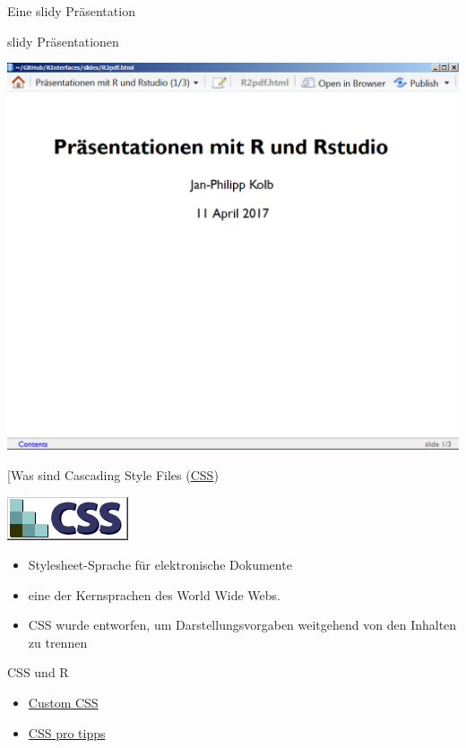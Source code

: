 \documentclass[ignorenonframetext,]{beamer}
\providecommand{\tightlist}{%
\setlength{\itemsep}{0pt}\setlength{\parskip}{0pt}}
\begin{document}
\begin{frame}{Eine slidy Präsentation}

\begin{block}{slidy Präsentationen}

\includegraphics{./tex2pdf.9796/6db7d2fb260418f59639684762690933ca3da69f.png}

\end{block}

\begin{block}{{[}Was sind Cascading Style Files
(\href{https://de.wikipedia.org/wiki/Cascading_Style_Sheets}{CSS})}

\includegraphics{./tex2pdf.9796/4a856d597d45801bad27c8d4bb2cb6abbc229bda.png}

\begin{itemize}
\tightlist
\item
  Stylesheet-Sprache für elektronische Dokumente
\item
  eine der Kernsprachen des World Wide Webs.
\item
  CSS wurde entworfen, um Darstellungsvorgaben weitgehend von den
  Inhalten zu trennen
\end{itemize}

\begin{block}{CSS und R}

\begin{itemize}
\tightlist
\item
  \href{http://rmarkdown.rstudio.com/html_document_format.html\#custom_css}{Custom
  CSS}
\item
  \href{https://github.com/AllThingsSmitty/css-protips\#use-a-css-reset}{CSS
  pro tipps}
\end{itemize}


\end{block}
\end{block}
\end{frame}
\end{document}
